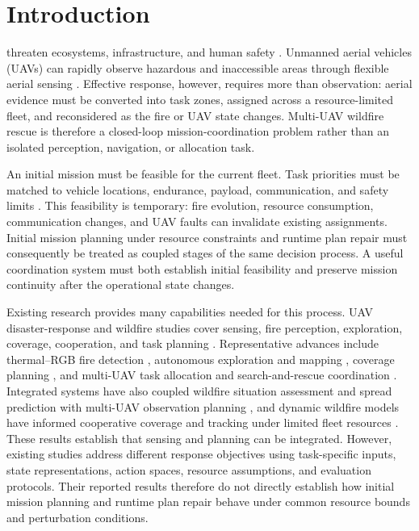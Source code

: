 \section{Introduction}
\label{sec:introduction}

 threaten ecosystems, infrastructure, and human safety
\cite{xu2020wildfires}. Unmanned aerial vehicles (UAVs) can rapidly observe
hazardous and inaccessible areas through flexible aerial sensing
\cite{akhloufi2021wildlanduav}. Effective response, however, requires more than
observation: aerial evidence must be converted into task zones, assigned across
a resource-limited fleet, and reconsidered as the fire or UAV state changes.
Multi-UAV wildfire rescue is therefore a closed-loop mission-coordination
problem rather than an isolated perception, navigation, or allocation task.

An initial mission must be feasible for the current fleet. Task priorities must
be matched to vehicle locations, endurance, payload, communication, and safety
limits \cite{floreano2015science}. This feasibility is temporary: fire
evolution, resource consumption, communication changes, and UAV faults can
invalidate existing assignments. Initial mission planning under resource
constraints and runtime plan repair must consequently be treated as coupled
stages of the same decision process. A useful coordination system must both
establish initial feasibility and preserve mission continuity after the
operational state changes.

Existing research provides many capabilities needed for this process. UAV
disaster-response and wildfire studies cover sensing, fire perception,
exploration, coverage, cooperation, and task planning
\cite{erdelj2017help,akhloufi2021wildlanduav,
boroujeni2024aiwildfiresurvey}. Representative advances include thermal--RGB
fire detection \cite{shamsoshoara2021flame}, autonomous exploration and
mapping \cite{popovic2017uavmapping}, coverage planning
\cite{cabreira2019coverageuav}, and multi-UAV task allocation and search-and-rescue
coordination \cite{bevacqua2015multidrone,baker2016uavsar}. Integrated
systems have also coupled wildfire situation assessment and spread prediction
with multi-UAV observation planning \cite{bailonruiz2022realtimewildfire}, and
dynamic wildfire models have informed cooperative coverage and tracking under
limited fleet resources \cite{seraj2022wildfireplanning}. These results
establish that sensing and planning can be integrated. However, existing studies
address different response objectives using task-specific inputs, state
representations, action spaces, resource assumptions, and evaluation protocols.
Their reported results therefore do not directly establish how initial
mission planning and runtime plan repair behave under common resource bounds and
perturbation conditions.

